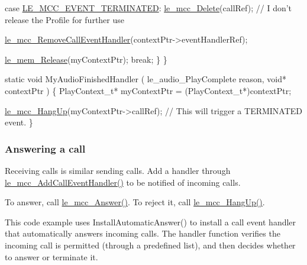 \begin{DoxyCode}
        \textcolor{keywordflow}{case} \hyperlink{le__mcc__interface_8h_aefc4679ffa76d0e04c578572c22f06cfa38b7c4ab21fa9828be8169372e41ae98}{LE\_MCC\_EVENT\_TERMINATED}:
            \hyperlink{le__mcc__interface_8h_a1a016e6443df2d3ee99113649f4f34ae}{le\_mcc\_Delete}(callRef);
            \textcolor{comment}{// I don't release the Profile for further use}

            \hyperlink{le__mcc__interface_8h_a8a12dc6f1707cf52818d9c2d8281630c}{le\_mcc\_RemoveCallEventHandler}(contextPtr->eventHandlerRef);

            \hyperlink{le__mem_8h_a6d8e3fe430bcb81efe97b57ce30ef2de}{le\_mem\_Release}(myContextPtr);
            \textcolor{keywordflow}{break};
    \}
\}


\textcolor{keyword}{static} \textcolor{keywordtype}{void} MyAudioFinishedHandler
(
    le\_audio\_PlayComplete reason,
    \textcolor{keywordtype}{void}*                 contextPtr
)
\{
    PlayContext\_t* myContextPtr = (PlayContext\_t*)contextPtr;

    \hyperlink{le__mcc__interface_8h_a7b9567715a3cd30c83a3b6886eeb2044}{le\_mcc\_HangUp}(myContextPtr->callRef);  \textcolor{comment}{// This will trigger a TERMINATED event.}
\}
\end{DoxyCode}
\hypertarget{c_mcc_le_mcc_answering_a_call}{}\subsubsection{Answering a call}\label{c_mcc_le_mcc_answering_a_call}
Receiving calls is similar sending calls. Add a handler through \hyperlink{le__mcc__interface_8h_ab826cf4b9e3911e659a90d483081e7fe}{le\+\_\+mcc\+\_\+\+Add\+Call\+Event\+Handler()} to be notified of incoming calls.

To answer, call \hyperlink{le__mcc__interface_8h_a598349c6ccfa151dbd1d2f2a9c293ca4}{le\+\_\+mcc\+\_\+\+Answer()}. To reject it, call \hyperlink{le__mcc__interface_8h_a7b9567715a3cd30c83a3b6886eeb2044}{le\+\_\+mcc\+\_\+\+Hang\+Up()}.

This code example uses Install\+Automatic\+Answer() to install a call event handler that automatically answers incoming calls. The handler function verifies the incoming call is permitted (through a predefined list), and then decides whether to answer or terminate it.



